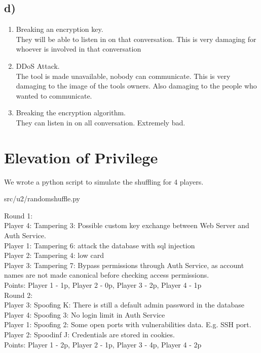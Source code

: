 \subsection* {d)}
\begin{enumerate}
    \item Breaking an encryption key. \\
    They will be able to listen in on that conversation. This is very damaging for whoever is involved in that conversation
    \item DDoS Attack. \\
    The tool is made unavailable, nobody can communicate. This is very damaging to the image of the tools owners. Also damaging to the people who wanted to communicate. 
    \item Breaking the encryption algorithm. \\
    They can listen in on all conversation. Extremely bad. 
\end{enumerate}

\section{Elevation of Privilege}
We wrote a python script to simulate the shuffling for 4 players.
										
{src/u2/randomshuffle.py}

Round 1: \\
Player 4: Tampering 3: Possible custom key exchange between Web Server and Auth Service. \\
Player 1: Tampering 6: attack the database with sql injection \\
Player 2: Tampering 4: low card\\
Player 3: Tampering 7: Bypass permissions through Auth Service, as account names are not made canonical before checking access permissions. \\
Points: Player 1 - 1p, Player 2 - 0p, Player 3 - 2p, Player 4 - 1p\\

Round 2:  \\
Player 3: Spoofing K: There is still a default admin password in the database \\
Player 4: Spoofing 3: No login limit in Auth Service \\
Player 1: Spoofing 2: Some open ports with vulnerabilities data. E.g. SSH port. \\
Player 2: Spoodinf J: Credentials are stored in cookies.\\
Points: Player 1 - 2p, Player 2 - 1p, Player 3 - 4p, Player 4 - 2p\\

